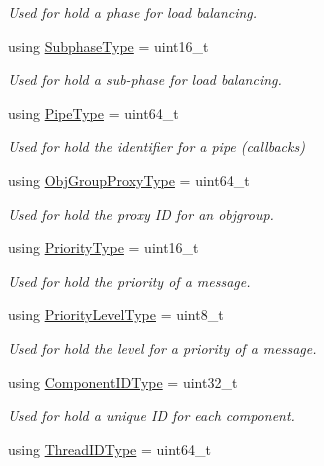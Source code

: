 \begin{DoxyCompactItemize}
\begin{DoxyCompactList}\small\item\em Used for hold a phase for load balancing. \end{DoxyCompactList}\item 
using \hyperlink{namespacevt_ae78cbfdf1e57470e33eedb074f2beeba}{Subphase\+Type} = uint16\+\_\+t
\begin{DoxyCompactList}\small\item\em Used for hold a sub-\/phase for load balancing. \end{DoxyCompactList}\item 
using \hyperlink{namespacevt_ac9852acda74d1896f48f406cd72c7bd3}{Pipe\+Type} = uint64\+\_\+t
\begin{DoxyCompactList}\small\item\em Used for hold the identifier for a pipe (callbacks) \end{DoxyCompactList}\item 
using \hyperlink{namespacevt_ad7cae989df485fccca57f0792a880a8e}{Obj\+Group\+Proxy\+Type} = uint64\+\_\+t
\begin{DoxyCompactList}\small\item\em Used for hold the proxy ID for an objgroup. \end{DoxyCompactList}\item 
using \hyperlink{namespacevt_a86bff9f556eb761b27fc8600d006ac04}{Priority\+Type} = uint16\+\_\+t
\begin{DoxyCompactList}\small\item\em Used for hold the priority of a message. \end{DoxyCompactList}\item 
using \hyperlink{namespacevt_a53e07fdb3351b0f263e0dfd51b968d5e}{Priority\+Level\+Type} = uint8\+\_\+t
\begin{DoxyCompactList}\small\item\em Used for hold the level for a priority of a message. \end{DoxyCompactList}\item 
using \hyperlink{namespacevt_ab6ac935c168b809c422d5121da4f2700}{Component\+I\+D\+Type} = uint32\+\_\+t
\begin{DoxyCompactList}\small\item\em Used for hold a unique ID for each component. \end{DoxyCompactList}\item 
using \hyperlink{namespacevt_a9b887d814dd25ff495a0c8270304ac02}{Thread\+I\+D\+Type} = uint64\+\_\+t

\end{DoxyCompactItemize}
